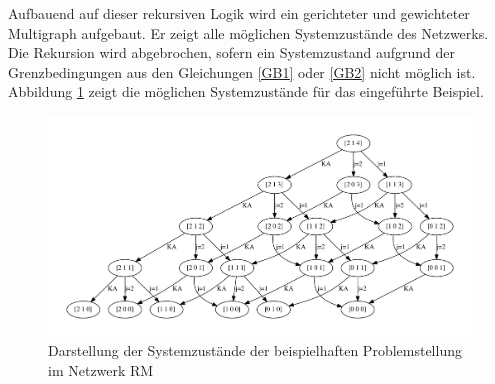 Aufbauend auf dieser rekursiven Logik wird ein gerichteter und gewichteter Multigraph aufgebaut. Er zeigt alle möglichen Systemzustände des Netzwerks. Die Rekursion wird abgebrochen, sofern ein Systemzustand aufgrund der Grenzbedingungen aus den Gleichungen \eqref{GB1} oder \eqref{GB2} nicht möglich ist. Abbildung \ref{B1} zeigt die möglichen Systemzustände für das eingeführte Beispiel.\\[.5cm]
\begin{figure}[h!]
  \begin{center}
    \includegraphics[width=150mm]{Bilder/Beispiel1.pdf}
    \caption{Darstellung der Systemzustände der beispielhaften Problemstellung im Netzwerk RM}  \label{B1}
  \end{center}
\end{figure}

